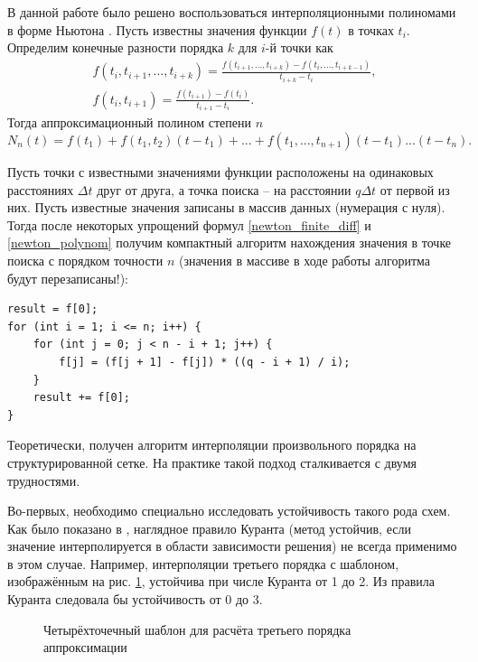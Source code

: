 В данной работе было решено воспользоваться интерполяционными полиномами в форме Ньютона \cite{petrov_lobanov}. Пусть известны значения функции $f(t)$ в точках $t_i$.
Определим конечные разности порядка $k$ для $i$-й точки как 
\begin{eqnarray}
\label{newton_finite_diff}
f(t_i, t_{i+1}, ..., t_{i+k}) = \frac{f(t_{i+1}, ..., t_{i+k}) - f(t_i, ..., t_{i+k-1})}{t_{i+k} - t_{i}}, \\
f(t_i, t_{i+1}) = \frac{f(t_{i+1}) - f(t_i)}{t_{i+1} - t_i}.
\end{eqnarray}
Тогда аппроксимационный полином степени $n$
\begin{equation}
\label{newton_polynom}
N_n(t) = f(t_1) + f(t_1, t_2)(t-t_1) + ... + f(t_1, ..., t_{n+1})(t-t_1)...(t-t_n).
\end{equation}

Пусть точки с известными значениями функции расположены на одинаковых расстояниях $\Delta t$ друг от друга, а точка поиска -- на расстоянии $q \Delta t$ от первой из них. Пусть известные значения записаны в массив данных (нумерация с нуля). Тогда после некоторых упрощений формул \eqref{newton_finite_diff} и \eqref{newton_polynom} получим компактный алгоритм нахождения значения в точке поиска с порядком точности $n$ (значения в массиве в ходе работы алгоритма будут перезаписаны!):


\begin{lstlisting}
result = f[0];
for (int i = 1; i <= n; i++) {
	for (int j = 0; j < n - i + 1; j++) {
		f[j] = (f[j + 1] - f[j]) * ((q - i + 1) / i);
	}
	result += f[0];
}
\end{lstlisting}
Теоретически, получен алгоритм интерполяции произвольного порядка на структурированной сетке. На практике такой подход сталкивается с двумя трудностями. 

Во-первых, необходимо специально исследовать устойчивость такого рода схем. Как было показано в \cite{favorskaya_disser}, наглядное правило Куранта (метод устойчив, если значение интерполируется в области зависимости решения) не всегда применимо в этом случае. Например, интерполяции третьего порядка с шаблоном, изображённым на рис. \ref{pic:stability}, устойчива при числе Куранта от 1 до 2. Из правила Куранта следовала бы устойчивость от 0 до 3.

\begin{figure}[H]
	\caption{Четырёхточечный шаблон для расчёта третьего порядка аппроксимации}
	\label{pic:stability}
\end{figure}


